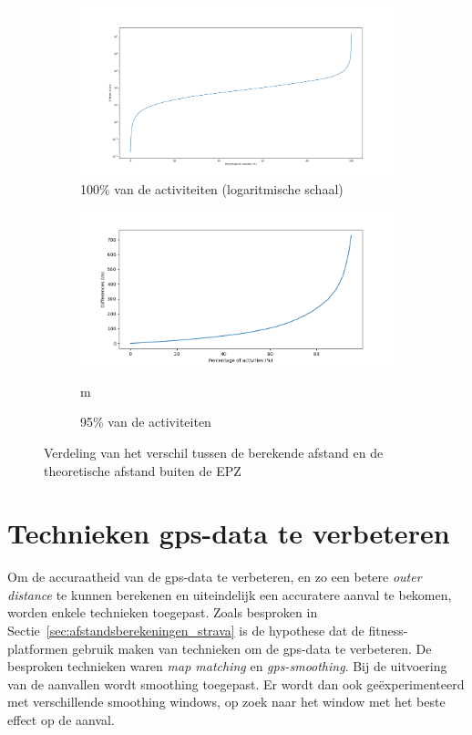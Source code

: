 \begin{figure}[h]
    \centering
    \begin{subfigure}{0.85\textwidth}
        \includegraphics[width=\textwidth]{fig/Afwijkingen&Analyses/Graphs/100_Differences_tov_theoretische_BefSmoothening.png}
        \caption{100\% van de activiteiten (logaritmische schaal)}\label{fig:differences_log}
    \end{subfigure}
    \begin{subfigure}[b]{0.85\textwidth}
        \includegraphics[width=\textwidth]{fig/Afwijkingen&Analyses/Graphs/95_Differences_tov_theoretische_BefSmoothening.png}
        \caption{95\% van de activiteiten}\label{fig:differences_nolog}m
    \end{subfigure}
    \caption{Verdeling van het verschil tussen de berekende afstand en de theoretische afstand buiten de \ac{EPZ} }\label{fig:differences_theoretical}
\end{figure}

\section{Technieken gps-data te verbeteren}
Om de accuraatheid van de \ac{gps}-data te verbeteren, en zo een betere
\textit{outer distance} te kunnen berekenen en uiteindelijk een accuratere
aanval te bekomen, worden enkele technieken toegepast. Zoals besproken in
Sectie~\ref{sec:afstandsberekeningen_strava} is de hypothese dat de
fitness-platformen gebruik maken van technieken om de \ac{gps}-data te
verbeteren. De besproken technieken waren \textit{map matching} en
\textit{\ac{gps}-smoothing}. Bij de uitvoering van de aanvallen wordt smoothing
toegepast. Er wordt dan ook geëxperimenteerd met verschillende smoothing
windows, op zoek naar het window met het beste effect op de aanval.

